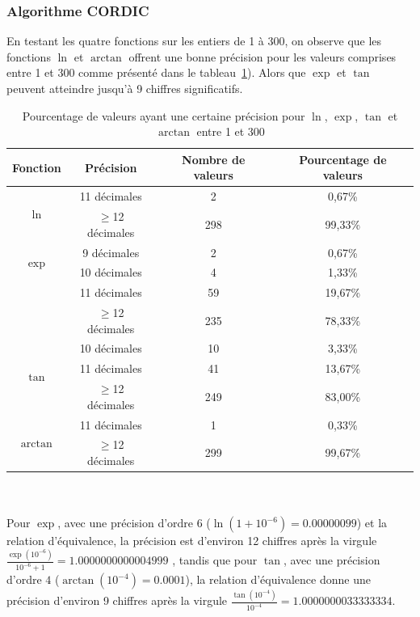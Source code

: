 \documentclass{article}
\begin{document}
\subsubsection{Algorithme CORDIC}
En testant les quatre fonctions sur les entiers de 1 à 300, on observe que les fonctions \( \ln \) et \( \arctan \) offrent une bonne précision pour les valeurs comprises entre 1 et 300 comme présenté dans le tableau~\ref{tab:precision_results}). Alors que \( \exp \) et \( \tan \) peuvent atteindre jusqu'à 9 chiffres significatifs. 
\begin{table}[h!]
\centering
\begin{tabular}{|c|c|c|c|}
\hline
\textbf{Fonction} & \textbf{Précision} & \textbf{Nombre de valeurs} & \textbf{Pourcentage de valeurs} \\
\hline
\multirow{2}{*}{$\ln$} 
& 11 décimales & 2 & 0,67\% \\
& $\geq$12 décimales & 298 & 99,33\% \\
\hline
\multirow{2}{*}{$\exp$} 
& 9 décimales & 2 & 0,67\% \\
& 10 décimales & 4 & 1,33\% \\
& 11 décimales & 59 & 19,67\% \\
& $\geq$12 décimales & 235 & 78,33\% \\
\hline
\multirow{3}{*}{$\tan$} 
& 10 décimales & 10 & 3,33\% \\
& 11 décimales & 41 & 13,67\% \\
& $\geq$12 décimales & 249 & 83,00\% \\
\hline
\multirow{2}{*}{$\arctan$} 
& 11 décimales & 1 & 0,33\% \\
& $\geq$12 décimales & 299 & 99,67\% \\
\hline
\end{tabular}
\caption{Pourcentage de valeurs ayant une certaine précision pour $\ln$, $\exp$, $\tan$ et $\arctan$ entre 1 et 300}
\label{tab:precision_results}
\end{table}
\\\\ Pour \( \exp \), avec une précision d'ordre \( 6 \) (\( \ln(1 + 10^{-6}) = 0.00000099 \)) et la relation d'équivalence, la précision est d'environ 12 chiffres après la virgule \(\frac{\exp(10^{-6})}{10^{-6} + 1} = 1.0000000000004999\) , tandis que pour \( \tan \), avec une précision d'ordre \( 4 \) (\( \arctan(10^{-4}) = 0.0001 \)), la relation d'équivalence donne une précision d'environ 9 chiffres après la virgule \(\frac{\tan(10^{-4})}{10^{-4}} = 1.0000000033333334\).
\end{document}
